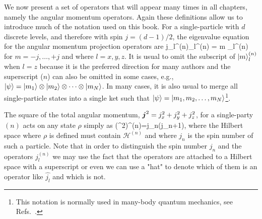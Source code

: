 We now present a set of operators that will appear many times in all chapters, namely the angular momentum operators.
Again these definitions allow us to introduce much of the notation used on this book.
For a single-particle with $d$ discrete levels, and therefore with spin $j=(d-1)/2$, the eigenvalue equation for the angular momentum projection operators are
\be
  j_l^{(n)}_l^{(n)} = m _l^{(n)}
  \label{eq:bg-single-particle-am-components}
\ee
for $m=-j,\dots,+j$ and where $l=x,y,z$.
It is usual to omit the subscript of $\vert{m}\rangle_l^{(n)}$ when $l=z$ because it is the preferred direction for many authors and the superscript ($n$) can also be omitted in some cases, e.g., $\vert{\psi}\rangle = \vert{m_1}\rangle\otimes\vert{m_2}\rangle\otimes\dots\otimes\vert{m_N}\rangle$.
In many cases, it is also usual to merge all single-particle states into a single ket such that $\vert{\psi}\rangle=\vert{m_1, m_2,\dots, m_N}\rangle$\footnote{
This notation is normally used in many-body quantum mechanics, see Refs.~\cite{Cohen-Tannoudji1977, Sakurai2010}.}.

The square of the total angular momentum, $\boldsymbol{j}^2=j_x^2+j_y^2+j_z^2$, for a single-party $(n)$ acts on any state $\rho$ simply as
\be
  (^2)^{(n)}\rho=j_n(j_n+1)\rho,
\ee
where the Hilbert space where $\rho$ is defined must contain $\mathcal{H}^{(n)}$ and where $j_n$ is the spin number of such a particle.
Note that in order to distinguish the spin number $j_n$ and the operators $j_l^{(n)}$ we may use the fact that the operators are attached to a Hilbert space with a superscript or even we can use a "hat" to denote which of them is an operator like $\hat{j_l}$ and which is not.

